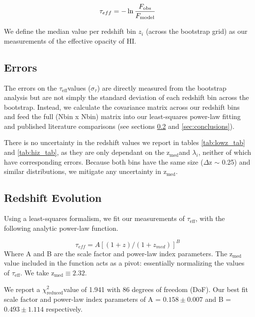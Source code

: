\documentclass[preprint2,times,tighten]{aastex6}
\newcommand{\teff}{$\tau_\mathrm{eff}$\space}
\newcommand{\zem}{$\mathrm{z_{med}}$\space}
\newcommand{\rchi}{$\chi^{2}_\mathrm{reduced}$}
\begin{document}
\begin{equation}
        \tau_{eff} = -\ln \frac{F_{\rm obs}}{F_{\rm model}}
        \label{eq2}
\end{equation}

We define the median value per redshift bin $z_{i}$ (across the bootstrap grid) as our measurements of the effective opacity of HI.

\subsection{Errors}
\label{subsec:errors}

The errors on the \teff values ($\sigma_{\tau}$) are directly measured from the bootstrap analysis but are not simply the standard deviation of each redshift bin across the bootstrap. Instead, we calculate the covariance matrix across our redshift bins and feed the full (Nbin x Nbin) matrix into our least-squares power-law fitting and published literature comparisons (see sections \ref{subsec:evo} and  \ref{sec:conclusions}).

There is no uncertainty in the redshift values we report in tables \ref{tab:lowz_tab} and \ref{tab:hiz_tab}, as they are only dependant on the \zem and $\lambda_{i}$, neither of which have corresponding errors. Because both bins have the same size ($\Delta$z $\sim$ 0.25) and similar distributions, we mitigate any uncertainty in \zem.

\subsection{Redshift Evolution} %
\label{subsec:evo}

Using a least-squares formalism, we fit our measurements of \teff, with the following analytic power-law function. 

\begin{center}
\begin{equation}
        \tau_{eff} = A[(1+z)/(1+z_{med})]^{B}
        \label{eq4}
\end{equation}
Where A and B are the scale factor and power-law index parameters. The \zem value included in the function acts as a pivot: essentially normalizing the values of \teff. We take \zem $\equiv 2.32$.
\end{center}

We report a \rchi value of 1.941 with 86 degrees of freedom (DoF). Our best fit scale factor and power-law index parameters of A = $0.158 \pm 0.007$ and B = $0.493 \pm 1.114$ respectively.
\end{document}
